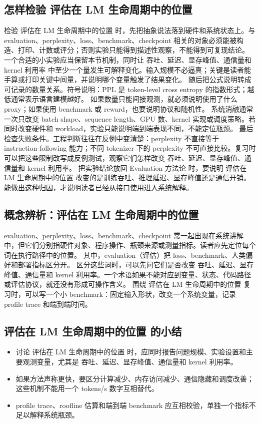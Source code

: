 \documentclass[a4paper]{article}
\begin{document}
\subsection{怎样检验 评估在 LM 生命周期中的位置}
检验 评估在 LM 生命周期中的位置 时，先把抽象说法落到硬件和系统状态上。与 evaluation、perplexity、loss、benchmark、checkpoint 相关的对象必须能被构造、打印、计数或评分；否则实验只能得到描述性观察，不能得到可复现结论。
一个合适的小实验应当保留本节机制，同时让 吞吐、延迟、显存峰值、通信量和 kernel 利用率 中至少一个量发生可解释变化。输入规模不必逼真；关键是读者能手算或打印关键中间量，并说明哪个变量触发了结果变化。
随后把公式说明转成可记录的数量关系。符号说明：PPL 是 token-level cross entropy 的指数形式；越低通常表示语言建模越好。 如果数量只能间接观测，就必须说明使用了什么 proxy；如果使用 benchmark 或 reward，也要说明协议和随机性。
系统消融通常一次只改变 batch shape、sequence length、GPU 数、kernel 实现或调度策略。若同时改变硬件和 workload，实验只能说明端到端表现不同，不能定位瓶颈。
最后检查失败条件。工程判断往往在反例中变清楚：perplexity 不直接等于 instruction-following 能力；不同 tokenizer 下的 perplexity 不可直接比较。复习时可以把这些限制改写成反例测试，观察它们怎样改变 吞吐、延迟、显存峰值、通信量和 kernel 利用率。
把实验结论放回 Evaluation 方法论 时，要说明 评估在 LM 生命周期中的位置 改变的是训练吞吐、推理延迟、显存峰值还是通信开销。能做出这种归因，才说明读者已经从接口使用进入系统解释。
\subsection{概念辨析：评估在 LM 生命周期中的位置}
evaluation、perplexity、loss、benchmark、checkpoint 常一起出现在系统讲解中，但它们分别指硬件对象、程序操作、瓶颈来源或测量指标。读者应先定位每个词在执行路径中的位置。
其中，evaluation（评估）把 loss、benchmark、人类偏好和部署指标区分开。
区分这些词时，可以先问它们是否改变 吞吐、延迟、显存峰值、通信量和 kernel 利用率。一个术语如果不能对应到变量、状态、代码路径或评估协议，就还没有形成可操作含义。
围绕 评估在 LM 生命周期中的位置 复习时，可以写一个小 benchmark：固定输入形状，改变一个系统变量，记录 profile trace 和端到端时间。
\subsection{评估在 LM 生命周期中的位置 的小结}
\begin{itemize}
\item 讨论 评估在 LM 生命周期中的位置 时，应同时报告问题规模、实验设置和主要观测变量，尤其是 吞吐、延迟、显存峰值、通信量和 kernel 利用率。
\item 如果方法声称更快，要区分计算减少、内存访问减少、通信隐藏和调度改善；这些机制不能用一个 tokens/s 数字互相替代。
\item profile trace、roofline 估算和端到端 benchmark 应互相校验，单独一个指标不足以解释系统瓶颈。
\end{itemize}
\end{document}
